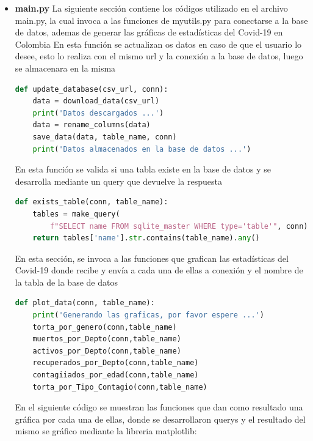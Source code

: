 \documentclass[conference,compsoc,onecolumn]{IEEEtran}
\begin{document}
\begin{itemize}
\begin{lstlisting}[language=python, caption=Funcion del desarrollo de querys, captionpos=b, label=lst:SNRCode]
      \end{lstlisting}
    \singlespacing
  \item \textbf{main.py}
  \singlespacing
 La siguiente sección contiene los códigos utilizado en el archivo main.py, la cual invoca a las funciones de myutils.py para conectarse a la base de datos, ademas de generar las gráficas de estadísticas del Covid-19 en Colombia
                    \singlespacing 
        En esta función se actualizan os datos en caso de que el usuario lo desee, esto lo realiza con el mismo url y la conexión a la base de datos, luego se almacenara en la misma
        \begin{lstlisting}[language=python, caption=Actualización de datos Covid-19, captionpos=b, label=lst:SNRCode]
def update_database(csv_url, conn):
    data = download_data(csv_url)
    print('Datos descargados ...')
    data = rename_columns(data)
    save_data(data, table_name, conn)
    print('Datos almacenados en la base de datos ...')
      \end{lstlisting}
      
        \singlespacing 
En esta función se valida si una tabla existe en la base de datos y se desarrolla  mediante un query que devuelve la respuesta
        \begin{lstlisting}[language=python, caption=Validacion si una tabla existe en la BD, captionpos=b, label=lst:SNRCode]
def exists_table(conn, table_name):
    tables = make_query(
        f"SELECT name FROM sqlite_master WHERE type='table'", conn)
    return tables['name'].str.contains(table_name).any()

      \end{lstlisting}
              \singlespacing 
En esta sección, se invoca a las funciones que grafican las estadísticas del Covid-19 donde recibe y envía a cada una de ellas a conexión y el nombre de la tabla de la base de datos
        \begin{lstlisting}[language=python, caption=Invocación a las funciones graficadoras, captionpos=b, label=lst:SNRCode]
def plot_data(conn, table_name):
    print('Generando las graficas, por favor espere ...')
    torta_por_genero(conn,table_name)
    muertos_por_Depto(conn,table_name)
    activos_por_Depto(conn,table_name)
    recuperados_por_Depto(conn,table_name)
    contagiiados_por_edad(conn,table_name)
    torta_por_Tipo_Contagio(conn,table_name)
      \end{lstlisting}
              \singlespacing 
En el siguiente código se muestran las funciones que dan como resultado una gráfica por cada una de ellas, donde se desarrollaron querys y el resultado del mismo se gráfico mediante la libreria matplotlib:
        \begin{lstlisting}[language=python, caption=Funciones que muestran las estadísticas del Covid-19, captionpos=b, label=lst:SNRCode]



\end{lstlisting}
\end{itemize}
\end{document}
